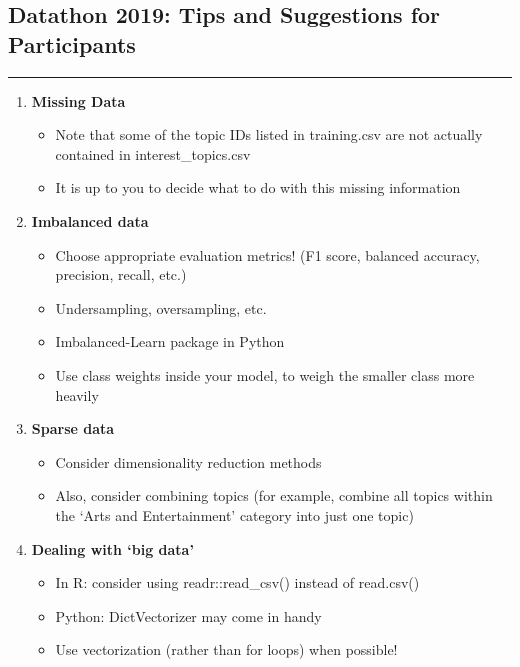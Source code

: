 \documentclass[12pt,letterpaper]{article}
\begin{document}
\begin{center}
\section*{Datathon 2019: Tips and Suggestions for Participants}
\end{center}

\hrule

\vspace{6mm}


\begin{enumerate}[label=\textbf{(\alph*)}]

\item \textbf{Missing Data}

\begin{itemize}
  \item Note that some of the topic IDs listed in training.csv are not actually contained in interest\_topics.csv
  \item It is up to you to decide what to do with this missing information
\end{itemize}

\item \textbf{Imbalanced data}

\begin{itemize}
  \item Choose appropriate evaluation metrics! (F1 score, balanced accuracy, precision, recall, etc.)
  \item Undersampling, oversampling, etc.
  \item Imbalanced-Learn package in Python
  \item Use class weights inside your model, to weigh the smaller class more heavily
\end{itemize}

\item \textbf{Sparse data}

\begin{itemize}
  \item Consider dimensionality reduction methods
  \item Also, consider combining topics (for example, combine all topics within the `Arts and Entertainment' category into just one topic)

\end{itemize}


\item \textbf{Dealing with `big data'}


\begin{itemize}
  \item In R: consider using readr::read\_csv() instead of read.csv()
  \item Python: DictVectorizer may come in handy
  \item Use vectorization (rather than for loops) when possible!
\end{itemize}


\end{enumerate}
\end{document}
